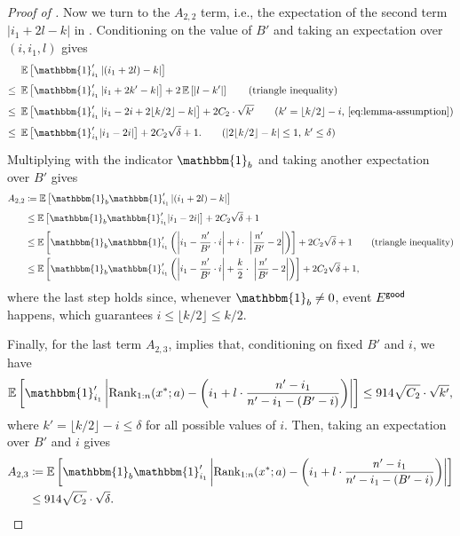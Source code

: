 \begin{proof}[Proof of ]
Now we turn to the $A_{2,2}$ term, i.e., the expectation of the second term $|i_1 + 2l - k|$ in . Conditioning on the value of $B'$ and taking an expectation over $(i, i_1, l)$ gives
\begin{align*}
    &~\Ex{}{\mathbbm{1}_{i_1}'\left|(i_1 + 2l)-k\right|}\\
\le &~\Ex{}{\mathbbm{1}_{i_1}'\left|i_1 + 2k' - k\right|} + 2\Ex{}{\left|l - k'\right|} \tag{triangle inequality}\\
\le &~\Ex{}{\mathbbm{1}_{i_1}'\left|i_1 - 2i + 2\lfloor k/2\rfloor -k\right|} + 2C_2 \cdot \sqrt{k'} \tag{$k' = \lfloor k/2\rfloor - i$, \Cref{eq:lemma-assumption}}\\
\le &~\Ex{}{\mathbbm{1}_{i_1}'|i_1 - 2i|} + 2C_2\sqrt{\delta}+ 1. \tag{$|2\lfloor k/2\rfloor - k| \le 1$, $k' \le \delta$}
\end{align*}
Multiplying with the indicator $\mathbbm{1}_b$ and taking another expectation over $B'$ gives
\begin{align*}
    A_{2,2}
&       \coloneqq\Ex{}{\mathbbm{1}_b\mathbbm{1}_{i_1}'\left|(i_1 + 2l)-k\right|}\\
&\le    \Ex{}{\mathbbm{1}_b\mathbbm{1}_{i_1}'|i_1 - 2i|} + 2C_2\sqrt{\delta}+ 1\\
&\le    \Ex{}{\mathbbm{1}_b\mathbbm{1}_{i_1}'\left(\left|i_1 - \frac{n'}{B'}\cdot i\right| + i\cdot\ \left|\frac{n'}{B'} - 2\right|\right)} + 2C_2\sqrt{\delta}+ 1 \tag{triangle inequality}\\
&\le    \Ex{}{\mathbbm{1}_b\mathbbm{1}_{i_1}'\left(\left|i_1 - \frac{n'}{B'}\cdot i\right| + \frac{k}{2}\cdot\ \left|\frac{n'}{B'} - 2\right|\right)} + 2C_2\sqrt{\delta} + 1,
\end{align*}
where the last step holds since, whenever $\mathbbm{1}_b \ne 0$, event $E^{\textsf{good}}$ happens, which guarantees $i \le \lfloor k/2\rfloor \le k/2$.

Finally, for the last term $A_{2,3}$,  implies that, conditioning on fixed $B'$ and $i$, we have
\[
    \Ex{}{\mathbbm{1}_{i_1}'\left|\rank_{1:n}(x^*; a) - \left(i_1+l\cdot \frac{n'-i_1}{n'-i_1-(B'-i)}\right)\right|} \le 914\sqrt{C_2}\cdot\sqrt{k'},
\]
where $k' = \lfloor k/2\rfloor - i \le \delta$ for all possible values of $i$. Then, taking an expectation over $B'$ and $i$ gives
\begin{align*}
            A_{2,3}
&\coloneqq  \Ex{}{\mathbbm{1}_b\mathbbm{1}_{i_1}'\left|\rank_{1:n}(x^*; a) - \left(i_1+l\cdot \frac{n'-i_1}{n'-i_1-(B'-i)}\right)\right|}\\
&\le       914\sqrt{C_2}\cdot\sqrt{\delta}.
\end{align*}


\end{proof}
